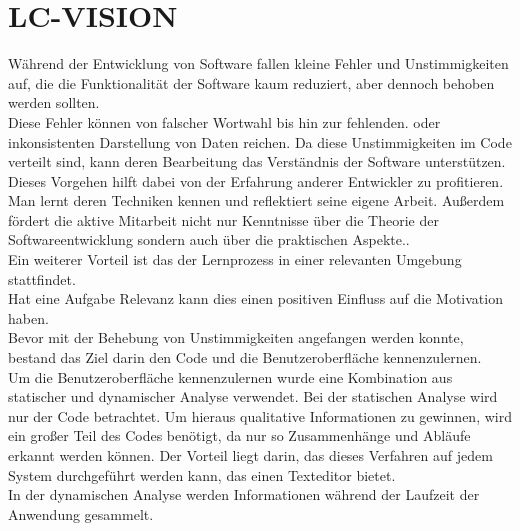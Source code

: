 \documentclass[12pt,a4paper]{article}
\begin{document}
\section{LC-VISION}
Während der Entwicklung von Software fallen kleine Fehler und Unstimmigkeiten auf, die die Funktionalität der Software kaum reduziert, aber dennoch behoben werden sollten. \\
Diese Fehler können von falscher Wortwahl bis hin zur fehlenden. oder inkonsistenten Darstellung von Daten reichen. Da diese Unstimmigkeiten im Code verteilt sind, kann deren Bearbeitung das Verständnis der Software unterstützen.\\
Dieses Vorgehen hilft dabei von der Erfahrung anderer Entwickler zu profitieren. Man lernt deren Techniken kennen und reflektiert seine eigene Arbeit. Außerdem fördert die aktive Mitarbeit nicht nur Kenntnisse über die Theorie der Softwareentwicklung sondern auch über die praktischen Aspekte.\cite{34908}.\\
Ein weiterer Vorteil ist das der Lernprozess in einer relevanten Umgebung stattfindet\cite{34908}.\\
Hat eine Aufgabe Relevanz kann dies einen positiven Einfluss auf die Motivation haben. \\
Bevor mit der Behebung von Unstimmigkeiten angefangen werden konnte, bestand das Ziel darin den Code und die Benutzeroberfläche kennenzulernen. \\
Um die Benutzeroberfläche kennenzulernen wurde eine Kombination aus statischer und dynamischer Analyse verwendet. Bei der statischen Analyse wird nur der Code betrachtet. Um hieraus qualitative Informationen zu gewinnen, wird ein großer Teil des Codes benötigt, da nur so Zusammenhänge und Abläufe erkannt werden können\cite{mock2003dynamic}. Der Vorteil liegt darin, das dieses Verfahren auf jedem System durchgeführt werden kann, das einen Texteditor bietet. \\
In der dynamischen Analyse werden Informationen während der Laufzeit der Anwendung gesammelt\cite{mock2003dynamic}. \\
\end{document}
